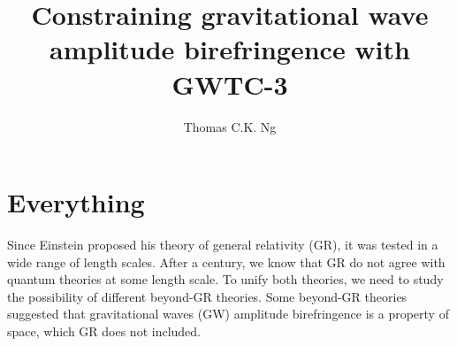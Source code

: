 \documentclass[twocolumn]{aastex631}
\begin{document}
\title{Constraining gravitational wave amplitude birefringence with GWTC-3}

\author{Thomas C.K. Ng}

\begin{abstract}
    
\end{abstract}

\section{Everything}
Since Einstein proposed his theory of general relativity (GR), it was tested in a wide range of length scales.
After a century, we know that GR do not agree with quantum theories at some length scale.
To unify both theories, we need to study the possibility of different beyond-GR theories.
Some beyond-GR theories suggested that gravitational waves (GW) amplitude birefringence is a property of space, which GR does not included.
\end{document}
